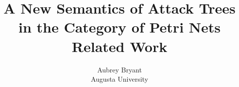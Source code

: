 \documentclass {article}
\title{A New Semantics of Attack Trees in the Category of Petri Nets\\\medskip Related Work}
\author{Aubrey Bryant \\Augusta University}
\begin{document}
\maketitle
\nocite{*}


\end{document}
